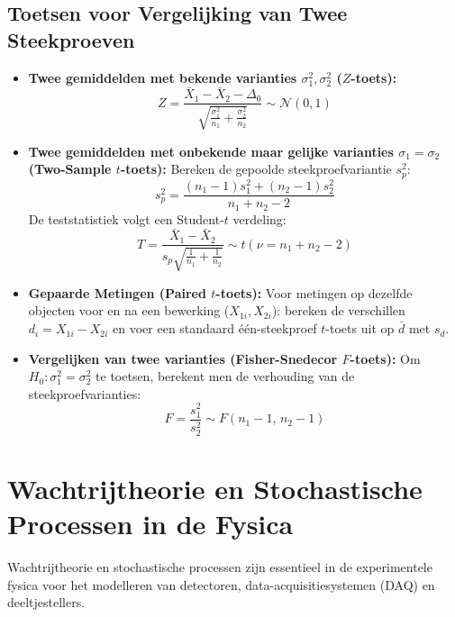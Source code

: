 \documentclass[11pt,a4paper]{article}
\newcommand{\normdist}{\mathcal{N}}
\begin{document}
\subsection{Toetsen voor Vergelijking van Twee Steekproeven}
\begin{itemize}[leftmargin=1.5em]
    \item \textbf{Twee gemiddelden met bekende varianties $\sigma_1^2, \sigma_2^2$ ($Z$-toets):}
    \begin{equation}
        Z = \frac{\bar{X}_1 - \bar{X}_2 - \Delta_0}{\sqrt{\frac{\sigma_1^2}{n_1} + \frac{\sigma_2^2}{n_2}}} \sim \normdist(0, 1)
    \end{equation}
    \item \textbf{Twee gemiddelden met onbekende maar gelijke varianties $\sigma_1 = \sigma_2$ (Two-Sample $t$-toets):}
    Bereken de gepoolde steekproefvariantie $s_p^2$:
    \begin{equation}
        s_p^2 = \frac{(n_1 - 1)s_1^2 + (n_2 - 1)s_2^2}{n_1 + n_2 - 2}
    \end{equation}
    De teststatistiek volgt een Student-$t$ verdeling:
    \begin{equation}
        T = \frac{\bar{X}_1 - \bar{X}_2}{s_p \sqrt{\frac{1}{n_1} + \frac{1}{n_2}}} \sim t(\nu = n_1 + n_2 - 2)
    \end{equation}
    \item \textbf{Gepaarde Metingen (Paired $t$-toets):}
    Voor metingen op dezelfde objecten voor en na een bewerking ($X_{1i}, X_{2i}$): bereken de verschillen $d_i = X_{1i} - X_{2i}$ en voer een standaard één-steekproef $t$-toets uit op $\bar{d}$ met $s_d$.
    \item \textbf{Vergelijken van twee varianties (Fisher-Snedecor $F$-toets):}
    Om $H_0: \sigma_1^2 = \sigma_2^2$ te toetsen, berekent men de verhouding van de steekproefvarianties:
    \begin{equation}
        F = \frac{s_1^2}{s_2^2} \sim F(n_1 - 1, \, n_2 - 1)
    \end{equation}
\end{itemize}


\section{Wachtrijtheorie en Stochastische Processen in de Fysica}

Wachtrijtheorie en stochastische processen zijn essentieel in de experimentele fysica voor het modelleren van detectoren, data-acquisitiesystemen (DAQ) en deeltjestellers.
\end{document}
